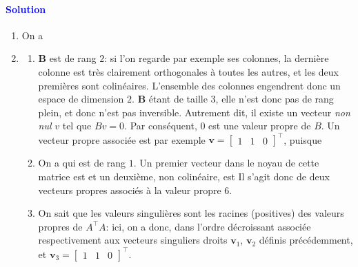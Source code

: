 \paragraph{\textcolor{blue}{Solution}}
\begin{enumerate}
	\item On a
	\item 
	\begin{enumerate}
	\item $\mathbf{B}$ est de rang $2$: si l'on regarde par exemple ses colonnes, la dernière colonne est très clairement orthogonales à toutes les autres, et les deux premières sont colinéaires. L'ensemble des colonnes engendrent donc un espace de dimension $2$. $\mathbf{B}$ étant de taille $3$, elle n'est donc pas de rang plein, et donc n'est pas inversible. Autrement dit, il existe un vecteur \emph{non nul} $v$ tel que $Bv = 0$. Par conséquent, $0$ est une valeur propre de $B$. Un vecteur propre associée est par exemple $\mathbf{v} = \begin{bmatrix} 1 & 1 & 0\end{bmatrix}^\top$, puisque
	\item On a
	qui est de rang $1$. Un premier vecteur dans le noyau de cette matrice est
	et un deuxième, non colinéaire, est
	Il s'agit donc de deux vecteurs propres associés à la valeur propre $6$.
	\item On sait que les valeurs singulières sont les racines (positives) des valeurs propres de $A^\top A$: ici, on a donc, dans l'ordre décroissant
	associée respectivement aux vecteurs singuliers droits $\mathbf{v}_1$, $\mathbf{v}_2$ définis précédemment, et $\mathbf{v}_3 = \begin{bmatrix} 1 & 1 & 0 \end{bmatrix}^\top$.
	

\end{enumerate}
\end{enumerate}
